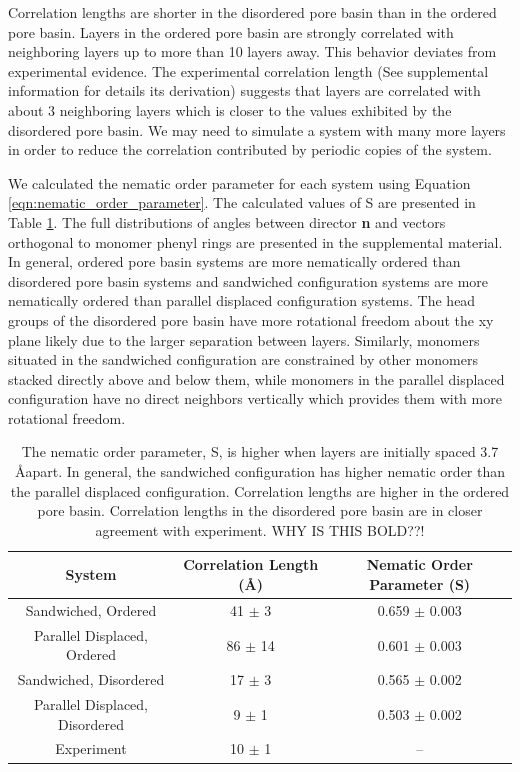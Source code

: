 \documentclass[journal=jpcbfk,manusciprt=article]{achemso}
\begin{document}
  Correlation lengths are shorter in the disordered pore basin than in the
  ordered pore basin. Layers in the ordered pore basin are strongly correlated
  with neighboring layers up to more than 10 layers away. This behavior deviates
  from experimental evidence. The experimental correlation length (See
  supplemental information for details its derivation) suggests that layers are
  correlated with about 3 neighboring layers which is closer to the values
  exhibited by the disordered pore basin. We may need to simulate a system with
  many more layers in order to reduce the correlation contributed by periodic
  copies of the system. 

  We calculated the nematic order parameter for each system using Equation
  \ref{eqn:nematic_order_parameter}. The calculated values of S are presented in
  Table \ref{table:nematic}. The full distributions of angles between director
  \textbf{n} and vectors orthogonal to monomer phenyl rings are presented in the
  supplemental material. In general, ordered pore basin systems are more
  nematically ordered than disordered pore basin systems and sandwiched
  configuration systems are more nematically ordered than parallel displaced
  configuration systems. The head groups of the disordered pore basin have more
  rotational freedom about the xy plane likely due to the larger separation
  between layers. Similarly, monomers situated in the sandwiched configuration
  are constrained by other monomers stacked directly above and below them, while
  monomers in the parallel displaced configuration have no direct neighbors
  vertically which provides them with more rotational freedom. 

  \begin{table}[h]
  \centering
  \begin{tabular}{ccc}
  \toprule
  System & Correlation Length (\AA) & Nematic Order Parameter (S) \\
  \midrule
  Sandwiched, Ordered & 41 $\pm$ 3 & 0.659 $\pm$ 0.003 \\
  Parallel Displaced, Ordered & 86 $\pm$ 14 & 0.601 $\pm$ 0.003 \\
  Sandwiched, Disordered & 17 $\pm$ 3 & 0.565 $\pm$ 0.002 \\
  Parallel Displaced, Disordered & 9 $\pm$ 1 & 0.503 $\pm$ 0.002 \\
  Experiment & 10 $\pm$ 1 & -- \\
  \bottomrule
  \end{tabular}
  \caption{The nematic order parameter, S, is higher when layers are initially spaced
  3.7 \AA apart. In general, the sandwiched configuration has higher nematic order
  than the parallel displaced configuration. Correlation lengths are higher in
  the ordered pore basin. Correlation lengths in the disordered pore basin are
  in closer agreement with experiment. WHY IS THIS BOLD??!}~\label{table:nematic}
  \end{table}
\end{document}
